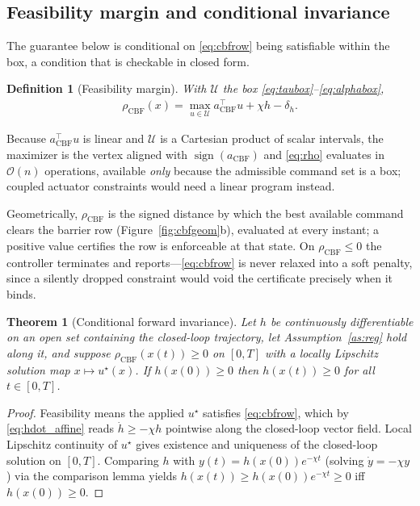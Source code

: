 \documentclass[letter, 10 pt, journal, twoside]{IEEEtran}
\theoremstyle{compact}
\newtheorem{theorem}{Theorem}
\newtheorem{definition}{Definition}
\begin{document}
\subsection{Feasibility margin and conditional invariance}

The guarantee below is conditional on \eqref{eq:cbfrow} being satisfiable within the box, a condition that is checkable in closed form.
 
\begin{definition}[Feasibility margin]\label{def:rho}
With $\mathcal{U}$ the box \eqref{eq:taubox}--\eqref{eq:alphabox},
\begin{align}
    \rho_{\mathrm{CBF}}(x)
    = \max_{u\in\mathcal{U}} a_{\mathrm{CBF}}^{\!\top}u + \chi h - \delta_h .
    \label{eq:rho}
\end{align}
\end{definition}
 
Because $a_{\mathrm{CBF}}^{\!\top}u$ is linear and $\mathcal{U}$ is a Cartesian product of scalar intervals, the maximizer is the vertex aligned with $\operatorname{sign}(a_{\mathrm{CBF}})$ and \eqref{eq:rho} evaluates in $\mathcal{O}(n)$ operations, %
available \emph{only} because the admissible command set is a box; coupled actuator constraints would need a linear program instead.
 
Geometrically, $\rho_{\mathrm{CBF}}$ is the signed distance by which the best available command clears the barrier row (Figure~\ref{fig:cbfgeom}b), evaluated at every instant; a positive value certifies the row is enforceable at that state. On $\rho_{\mathrm{CBF}}\le0$ the controller terminates and reports---\eqref{eq:cbfrow} is never relaxed into a soft penalty, since a silently dropped constraint would void the certificate precisely when it binds.

\begin{theorem}[Conditional forward invariance]\label{thm:invariance}
Let $h$ be continuously differentiable on an open set containing the closed-loop trajectory, let Assumption~\ref{as:reg} hold along it, and suppose $\rho_{\mathrm{CBF}}(x(t))\ge0$ on $[0,T]$ with a locally Lipschitz solution map $x\mapsto u^\star(x)$. If $h(x(0))\ge0$ then $h(x(t))\ge0$ for all $t\in[0,T]$.
\end{theorem}
 
\begin{proof}
Feasibility means the applied $u^\star$ satisfies \eqref{eq:cbfrow}, which by \eqref{eq:hdot_affine} reads $\dot h\ge-\chi h$ pointwise along the closed-loop vector field. Local Lipschitz continuity of $u^\star$ gives existence and uniqueness of the closed-loop solution on $[0,T]$. Comparing $h$ with $y(t)=h(x(0))e^{-\chi t}$ (solving $\dot y=-\chi y$) via the comparison lemma yields $h(x(t))\ge h(x(0))e^{-\chi t} \ge0$ iff $h(x(0))\ge0$.
\end{proof}
 
\end{document}
